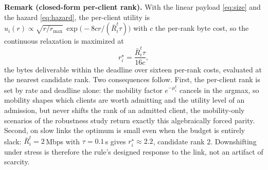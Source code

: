 \documentclass[a4paper,fleqn]{cas-dc}
\begin{document}
\par
\textbf{Remark (closed-form per-client rank).} With the linear payload \cref{eq:size} and the hazard \cref{eq:hazard}, the per-client utility is $u_i(r)\propto\sqrt{r/r_{\max}}\,\exp\!\big(\!-\!8cr/(\bar R_i^t\tau)\big)$ with $c$ the per-rank byte cost, so the continuous relaxation is maximized at
\begin{equation}
r_i^\star=\frac{\bar R_i^t\tau}{16c},
\label{eq:rstar}
\end{equation}
the bytes deliverable within the deadline over sixteen per-rank costs, evaluated at the nearest candidate rank. Two consequences follow. First, the per-client rank is set by rate and deadline alone: the mobility factor $e^{-\mu_i^t}$ cancels in the argmax, so mobility shapes which clients are worth admitting and the utility level of an admission, but never shifts the rank of an admitted client, the mobility-only scenarios of the robustness study return exactly this algebraically forced parity. Second, on slow links the optimum is small even when the budget is entirely slack: $\bar R_i^t=2$\,Mbps with $\tau=0.1$\,s gives $r_i^\star\approx2.2$, candidate rank 2. Downshifting under stress is therefore the rule's designed response to the link, not an artifact of scarcity.
\par
\end{document}
